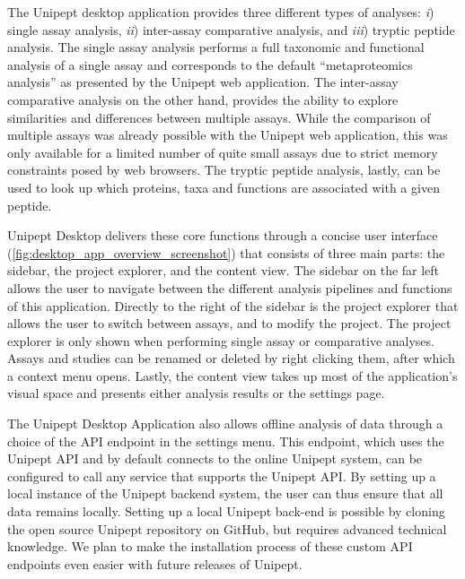 The Unipept desktop application provides three different types of
analyses: \emph{i}) single assay analysis, \emph{ii}) inter-assay
comparative analysis, and \emph{iii}) tryptic peptide analysis. The
single assay analysis performs a full taxonomic and functional analysis
of a single assay and corresponds to the default ``metaproteomics
analysis'' as presented by the Unipept web application. The inter-assay
comparative analysis on the other hand, provides the ability to explore
similarities and differences between multiple assays. While the
comparison of multiple assays was already possible with the Unipept web
application, this was only available for a limited number of quite small
assays due to strict memory constraints posed by web browsers. The
tryptic peptide analysis, lastly, can be used to look up which proteins,
taxa and functions are associated with a given peptide.

Unipept Desktop delivers these core functions through a concise user
interface (\autoref{fig:desktop_app_overview_screenshot}) that consists
of three main parts: the sidebar, the project explorer, and the content
view. The sidebar on the far left allows the user to navigate between
the different analysis pipelines and functions of this application.
Directly to the right of the sidebar is the project explorer that allows
the user to switch between assays, and to modify the project. The
project explorer is only shown when performing single assay or
comparative analyses. Assays and studies can be renamed or deleted by
right clicking them, after which a context menu opens. Lastly, the
content view takes up most of the application's visual space and
presents either analysis results or the settings page.

The Unipept Desktop Application also allows offline analysis of data
through a choice of the API endpoint in the settings menu. This
endpoint, which uses the Unipept API and by default connects to the
online Unipept system, can be configured to call any service that
supports the Unipept API. By setting up a local instance of the Unipept
backend system, the user can thus ensure that all data remains locally.
Setting up a local Unipept back-end is possible by cloning the open
source Unipept repository on GitHub, but requires advanced technical
knowledge. We plan to make the installation process of these custom API
endpoints even easier with future releases of Unipept.

